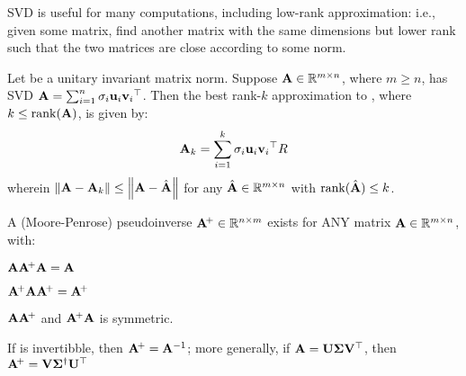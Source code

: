 \documentclass{article}
\begin{document}
\begin{solution}
    SVD is useful for many computations, including low-rank approximation: i.e., given some matrix, find another matrix with the same dimensions but lower rank such that the two matrices are close according to some norm.

    \begin{theorem} 
        Let \norm{\ignored} be a unitary invariant matrix norm. Suppose $\mathbf{A} \in \mathbb{R}^{m \times n}$, where $m \geq n$, has SVD $\mathbf{A} = \sum_{i=1}^n \sigma_i \mathbf{u}_i {\mathbf{v}_i}^\top$. Then the best rank-$k$ approximation to , where $k \leq \operatorname{rank}(\mathbf{A})$, is given by:
        $$\mathbf{A}_k = \sum_{i=1}^k \sigma_i \mathbf{u}_i {\mathbf{v}_i}^\top R$$
        wherein $\left\lVert \mathbf{A} - \mathbf{A}_k \right\rVert \leq \left\lVert \mathbf{A} - \hat{\mathbf{A}} \right\rVert$ for any $\hat{\mathbf{A}} \in \mathbb{R}^{m \times n}$ with $\operatorname{rank}(\hat{\mathbf{A}}) \leq k$.
    \end{theorem}

    A (Moore-Penrose) pseudoinverse ${\mathbf{A}}^{\!+} \in \mathbb{R}^{n \times m}$ exists for ANY matrix $\mathbf{A} \in \mathbb{R}^{m \times n}$, with:
    \begin{enumerate*}
        \item $\mathbf{A} {\mathbf{A}}^{\!+} \mathbf{A} = \mathbf{A}$
        \item ${\mathbf{A}}^{\!+} \mathbf{A} {\mathbf{A}}^{\!+} = {\mathbf{A}}^{\!+}$
        \item $\mathbf{A} {\mathbf{A}}^{\!+}$ and ${\mathbf{A}}^{\!+} \mathbf{A}$ is symmetric.
    \end{enumerate*} If  is invertibble, then ${\mathbf{A}}^{\!+} = {\mathbf{A}}^{-1}$; more generally, if $\mathbf{A} = \mathbf{U} \mathbf{\Sigma} {\mathbf{V}}^\top$, then ${\mathbf{A}}^{\!+} = \mathbf{V} \mathbf{\Sigma}^\dagger {\ensuremath{\mathbf{U}}}^\top$


\end{solution}
\end{document}
